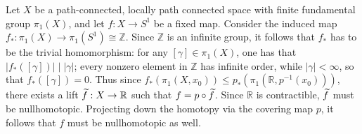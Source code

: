 \documentclass{article}
\begin{document}
	Let $X$ be a path-connected, locally path connected space with finite fundamental group $\pi_{1}(X)$, and let $f: X \to S^{1}$ be a fixed map. Consider the induced map $f_{\ast}: \pi_{1}(X) \to \pi_{1}(S^{1}) \cong \mathbb{Z}$. Since $\mathbb{Z}$ is an infinite group, it follows that $f_{\ast}$ has to be the trivial homomorphism: for any $[\gamma]\in \pi_{1}(X)$, one has that $|f_{\ast}([\gamma])| \mid |\gamma|$; every nonzero element in $\mathbb{Z}$ has infinite order, while $|\gamma| < \infty$, so that $f_{\ast}([\gamma]) = 0$. Thus since $f_{\ast}(\pi_{1}(X, x_{0})) \leq p_{\ast}(\pi_{1}(\mathbb{R}, p^{-1}(x_{0})))$, there exists a lift $\widetilde{f}: X \to \mathbb{R}$ such that $f = p \circ \widetilde{f}$. Since $\mathbb{R}$ is contractible, $\widetilde{f}$ must be nullhomotopic. Projecting down the homotopy via the covering map $p$, it follows that $f$ must be nullhomotopic as well. 
	
\end{document}

